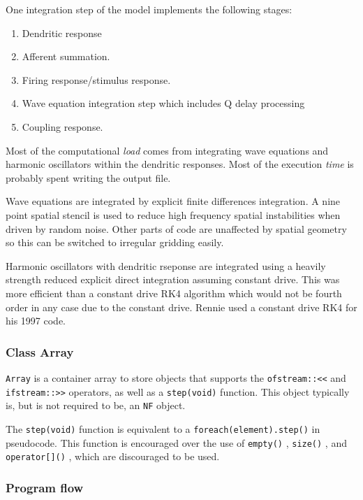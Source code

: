 \documentclass[12pt,a4paper]{article}
\newcommand{\type}[1]{{\small\small\tt #1} }
\begin{document}
One integration step of the model implements the following stages: 

\begin{enumerate}
	\item  Dendritic response
	\item  Afferent summation. 
	\item  Firing response/stimulus response. 
	\item  Wave equation integration step which includes Q delay processing 
	\item  Coupling response.
\end{enumerate}

Most of the computational {\em load} comes from integrating wave equations and harmonic oscillators within the dendritic responses. Most of the execution {\em time} is probably spent writing the output file.

Wave equations are integrated by explicit finite differences integration. A nine point spatial stencil is used to reduce high frequency spatial instabilities when driven by random noise. Other parts of code are unaffected by spatial geometry so this can be switched to irregular gridding easily.

Harmonic oscillators with dendritic rseponse are integrated using a heavily strength reduced explicit direct integration assuming constant drive. This was more efficient than a constant drive RK4 algorithm which would not be fourth order in any case due to the constant drive. Rennie used a constant drive RK4 for his 1997 code.

\subsubsection{Class Array}
\label{sec:array}

\type{Array} is a container array to store objects that supports the \type{ofstream::<<} and \type{ifstream::>>} operators, as well as a \type{step(void)} function. This object typically is, but is not required to be, an \type{NF} object.

The \type{step(void)} function is equivalent to a \type{foreach(element).step()} in pseudocode. This function is encouraged over the use of \type{empty()}, \type{size()}, and \type{operator[]()}, which are discouraged to be used.

\subsubsection{Program flow}
\end{document}
